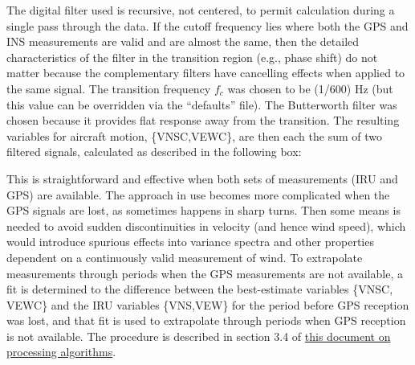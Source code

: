 \documentclass[12pt,twoside,english]{article}\usepackage[]{graphicx}\usepackage[]{color}
\let\OrgIndex\index
\renewcommand*{\index}[1]{\OrgIndex{#1}}
\begin{document}
%
The digital filter used is recursive, not centered, to permit calculation during a single pass through the data. If the cutoff frequency lies where both the GPS and INS measurements are valid and are almost the same, then the detailed characteristics of the filter in the transition region (e.g., phase shift) do not matter because the complementary filters have cancelling effects when applied to the same signal. The transition frequency $f_{c}$ was chosen to be (1/600) Hz (but this value can be overridden via the ``defaults'' file). The Butterworth filter was chosen because it provides flat response away from the transition. The resulting variables for aircraft motion, \{VNSC,VEWC\}, are then each the sum of two filtered signals, calculated as described in the following box:\\ 

This is straightforward and effective when both sets of measurements (IRU and GPS) are available. The approach in use becomes more complicated when the GPS signals are lost, as sometimes happens in sharp turns. Then some means is needed to avoid sudden discontinuities in velocity (and hence wind speed), which would introduce spurious effects into variance spectra and other properties dependent on a continuously valid measurement of wind. To extrapolate measurements through periods when the GPS measurements are not available, a fit is determined to the difference between the best-estimate variables \{VNSC, VEWC\} and the IRU variables \{VNS,VEW\} for the period before GPS reception was lost, and that fit is used to extrapolate through periods when GPS reception is not available. The procedure is described in section 3.4 of \href{https://drive.google.com/file/d/0B1kIUH45ca5ATFV5d3QyQ0JpSjA/view?usp=sharing}{this document on processing algorithms}. 
\end{document}
